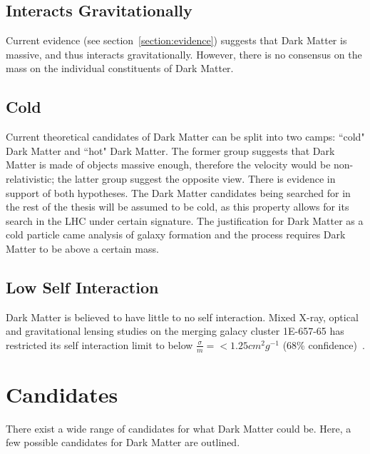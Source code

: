 \subsection{Interacts Gravitationally}
Current evidence (see section~\ref{section:evidence}) suggests that Dark Matter is massive, and thus interacts gravitationally. However, there is no consensus on the mass on the individual constituents of Dark Matter. 

\subsection{Cold}
Current theoretical candidates of Dark Matter can be split into two camps: ``cold" Dark Matter and ``hot" Dark Matter. The former group suggests that Dark Matter is made of objects massive enough, therefore the velocity would be non-relativistic; the latter group suggest the opposite view. There is evidence in support of both hypotheses. The Dark Matter candidates being searched for in the rest of the thesis will be assumed to be cold, as this property allows for its search in the LHC under certain signature. The justification for Dark Matter as a cold particle came analysis of galaxy formation and the process requires Dark Matter to be above a certain mass. 

\subsection{Low Self Interaction}
Dark Matter is believed to have little to no self interaction. Mixed X-ray, optical and gravitational lensing studies on the merging galacy cluster 1E-657-65 has restricted its self interaction limit to below $\frac{\sigma}{m}= < 1.25 cm^{2} g^{-1}$ (68\% confidence)~\cite{randall2008constraints}. 
 

\section{Candidates}
\label{section:candidates}
There exist a wide range of candidates for what Dark Matter could be. Here, a few possible candidates for Dark Matter are outlined.

